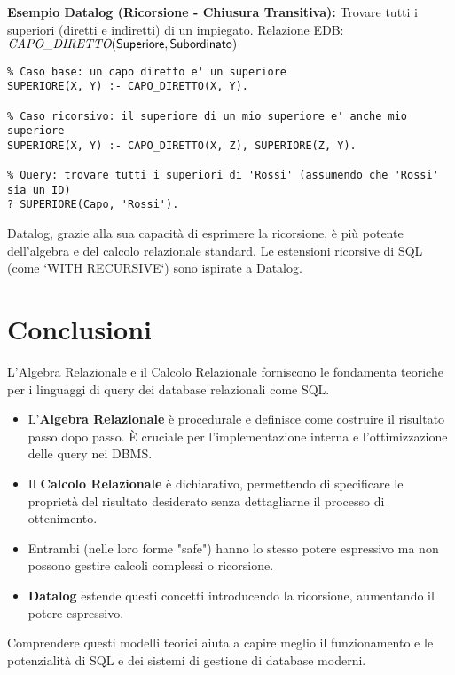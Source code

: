 	\textbf{Esempio Datalog (Ricorsione - Chiusura Transitiva):} Trovare tutti i superiori (diretti e indiretti) di un impiegato.
	Relazione EDB: $\textit{CAPO\_DIRETTO}(\textsf{Superiore}, \textsf{Subordinato})$
	\begin{verbatim}
% Caso base: un capo diretto e' un superiore
SUPERIORE(X, Y) :- CAPO_DIRETTO(X, Y).

% Caso ricorsivo: il superiore di un mio superiore e' anche mio superiore
SUPERIORE(X, Y) :- CAPO_DIRETTO(X, Z), SUPERIORE(Z, Y).

% Query: trovare tutti i superiori di 'Rossi' (assumendo che 'Rossi' sia un ID)
? SUPERIORE(Capo, 'Rossi').
	\end{verbatim}
	Datalog, grazie alla sua capacità di esprimere la ricorsione, è più potente dell'algebra e del calcolo relazionale standard. Le estensioni ricorsive di SQL (come `WITH RECURSIVE`) sono ispirate a Datalog.
	
	\section{Conclusioni}
	L'Algebra Relazionale e il Calcolo Relazionale forniscono le fondamenta teoriche per i linguaggi di query dei database relazionali come SQL.
	\begin{itemize}
		\item L'\textbf{Algebra Relazionale} è procedurale e definisce come costruire il risultato passo dopo passo. È cruciale per l'implementazione interna e l'ottimizzazione delle query nei DBMS.
		\item Il \textbf{Calcolo Relazionale} è dichiarativo, permettendo di specificare le proprietà del risultato desiderato senza dettagliarne il processo di ottenimento.
		\item Entrambi (nelle loro forme "safe") hanno lo stesso potere espressivo ma non possono gestire calcoli complessi o ricorsione.
		\item \textbf{Datalog} estende questi concetti introducendo la ricorsione, aumentando il potere espressivo.
	\end{itemize}
	Comprendere questi modelli teorici aiuta a capire meglio il funzionamento e le potenzialità di SQL e dei sistemi di gestione di database moderni.
	

